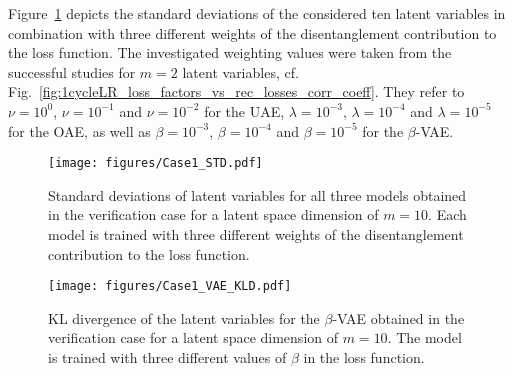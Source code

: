\smallskip
Figure~\ref{fig:case1_std} depicts the standard deviations of the considered ten latent variables in combination with three different weights of the disentanglement contribution to the loss function. 
The investigated weighting values were taken from the successful studies for $m=2$ latent variables, cf. Fig.~\ref{fig:1cycleLR_loss_factors_vs_rec_losses_corr_coeff}.  
%
 They refer to $\nu = 10^{0}$, $\nu = 10^{-1}$ and $\nu = 10^{-2}$ for the UAE, $\lambda = 10^{-3}$, $\lambda = 10^{-4}$ and $\lambda = 10^{-5}$ for the OAE, as well as $\beta = 10^{-3}$, $\beta = 10^{-4}$ and $\beta = 10^{-5}$ for the $\beta$-VAE.


\begin{figure}[h!]
    \centering
    \texttt{[image: figures/Case1\_STD.pdf]}
    \caption{Standard deviations of latent variables for all three models obtained in the verification case for a latent space dimension of $m=10$. 
    Each model is trained with
    three different weights of the disentanglement contribution to the loss function.}
    \label{fig:case1_std}
\end{figure}

\begin{figure}[h!]
    \centering
    \texttt{[image: figures/Case1\_VAE\_KLD.pdf]}
    \caption{KL divergence of the latent variables for the $\beta$-VAE
    obtained in the verification case for a latent space dimension of $m=10$. 
    The model is trained with
    three different values of $\beta$ in the loss function.}
    \label{fig:case1_kld}
\end{figure}


